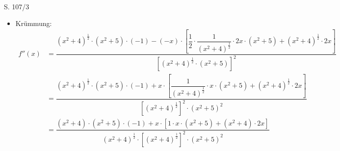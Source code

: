 \begin{Exercise}{S. 107/3}{}
\begin{enumerate}
\begin{enumerate}[label=\alph*),leftmargin=*]
{\begin{itemize}[leftmargin=*]
{                    \\[2.0ex]
                    $\Rightarrow \qquad G_{f}$ ist sms in $\left] \ -\infty; 0 \ \right]$ \\[1.0ex]
                    $\Rightarrow \qquad G_{f}$ ist smf in $\left[ \ 0; \infty \ \right[$\\[-2.0ex]
                    }
                \item Krümmung: \\[-2.0ex]{
                    \begin{align*}
                        f''(x) &= \dfrac{\left(x^{2} + 4\right)^{\frac{1}{2}} \cdot \left(x^{2} + 5 \right) \cdot \left(-1\right) - \left(-x\right) \cdot \left[\dfrac{1}{2} \cdot \dfrac{1}{\left(x^{2} + 4\right)^{\frac{1}{2}}} \cdot 2x \cdot \left(x^{2} + 5\right) + \left(x^{2} + 4\right)^{\frac{1}{2}} \cdot 2x\right]}{\left[\left(x^{2} + 4\right)^{\frac{1}{2}} \cdot \left(x^{2} + 5 \right)\right]^{2}} &&\\[2.0ex]
                        &= \dfrac{\left(x^{2} + 4\right)^{\frac{1}{2}} \cdot \left(x^{2} + 5 \right) \cdot \left(-1\right) + x \cdot \left[\dfrac{1}{\left(x^{2} + 4\right)^{\frac{1}{2}}} \cdot x \cdot \left(x^{2} + 5\right) + \left(x^{2} + 4\right)^{\frac{1}{2}} \cdot 2x\right]}{\left[\left(x^{2} + 4\right)^{\frac{1}{2}}\right]^{2} \cdot \left(x^{2} + 5 \right)^{2}} &&\\[2.0ex]
                        &= \dfrac{\left(x^{2} + 4\right) \cdot \left(x^{2} + 5 \right) \cdot \left(-1\right) + x \cdot \left[1 \cdot x \cdot \left(x^{2} + 5\right) + \left(x^{2} + 4\right) \cdot 2x\right]}{\left(x^{2} + 4\right)^{\frac{1}{2}} \cdot \left[\left(x^{2} + 4\right)^{\frac{1}{2}}\right]^{2} \cdot \left(x^{2} + 5 \right)^{2}} &&\\[2.0ex]

\end{align*}}
\end{itemize}}
\end{enumerate}
\end{enumerate}
\end{Exercise}
